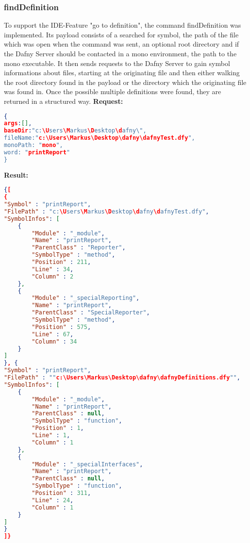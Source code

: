 \subsubsection{findDefinition}
To support the IDE-Feature "go to definition", the command findDefinition was implemented. Its payload consists of a searched for symbol, the path of the file which was open when the command was sent, an optional root directory and if the Dafny Server should be contacted in a mono environment, the path to the mono executable. It then sends requests to the Dafny Server to gain symbol informations about files, starting at the originating file and then either walking the root directory  found in the payload or the directory which the originating file was found in. Once the possible multiple definitions were found, they are returned in a structured way.\newline\newline
\textbf{Request: }
\begin{lstlisting}[language=json,firstnumber=1]
{
args:[],
baseDir:"c:\Users\Markus\Desktop\dafny\",
fileName:"c:\Users\Markus\Desktop\dafny\dafnyTest.dfy",
monoPath: "mono",
word: "printReport"
}

\end{lstlisting}

\textbf{Result: }
\begin{lstlisting}[language=json,firstnumber=1]
{[
{
"Symbol" : "printReport",
"FilePath" : "c:\Users\Markus\Desktop\dafny\dafnyTest.dfy",
"SymbolInfos": [
	{
		"Module" : "_module",
		"Name" : "printReport",
		"ParentClass" : "Reporter",
		"SymbolType" : "method",
		"Position" : 211,
		"Line" : 34,
		"Column" : 2
	},
	{
		"Module" : "_specialReporting",
		"Name" : "printReport",
		"ParentClass" : "SpecialReporter",
		"SymbolType" : "method",
		"Position" : 575,
		"Line" : 67,
		"Column" : 34
	}	
]
}, {
"Symbol" : "printReport",
"FilePath" : ""c:\Users\Markus\Desktop\dafny\dafnyDefinitions.dfy"",
"SymbolInfos": [
	{
		"Module" : "_module",
		"Name" : "printReport",
		"ParentClass" : null,
		"SymbolType" : "function",
		"Position" : 1,
		"Line" : 1,
		"Column" : 1
	},
	{
		"Module" : "_specialInterfaces",
		"Name" : "printReport",
		"ParentClass" : null,
		"SymbolType" : "function",
		"Position" : 311,
		"Line" : 24,
		"Column" : 1
	}	
]
}
]}
\end{lstlisting}


